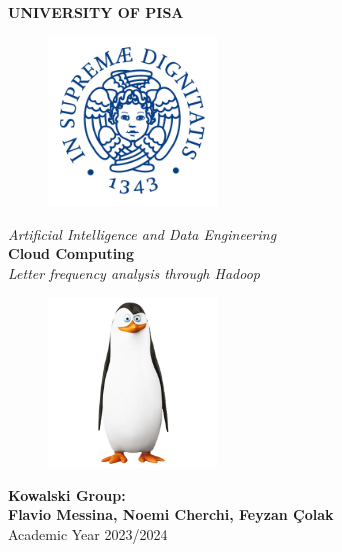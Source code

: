 \begin{titlepage}
    \centering
    \vspace*{\fill}
    {\LARGE \textbf{UNIVERSITY OF PISA}}\\[0.5cm]
    \begin{figure}[h]
        \centering
        \includegraphics[width=0.4\textwidth]{media/university-of-Pisa-logo.jpg}
    \end{figure}
    {\Large \textit{Artificial Intelligence and Data Engineering}}\\[1.5cm]
    {\LARGE \textbf{Cloud Computing}}\\[1cm]
    {\Large \textit{Letter frequency analysis through Hadoop}}\\[2cm]
    \begin{figure}[h]
        \centering
        \includegraphics[width=0.4\textwidth]{media/Kowalski4.jpg}
    \end{figure}
    {\Large \textbf{Kowalski Group:}}\\[0.5cm]
    {\large \textbf{Flavio Messina, Noemi Cherchi, Feyzan Çolak}}\\[0.5cm]
    {\large Academic Year 2023/2024}
    \vspace*{\fill}
\end{titlepage}

